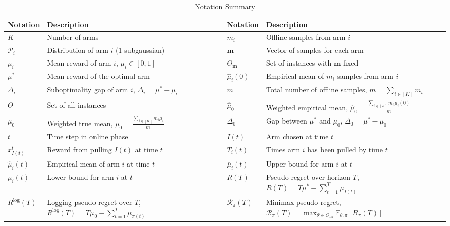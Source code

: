 \begin{APPENDICES}
\begin{table}[h]
\caption{Notation Summary}
    \centering
    \renewcommand{\arraystretch}{1.5}
    \begin{tabular}{|p{2.5cm}|p{5cm}|p{2.5cm}|p{5cm}|}
        \hline
        \textbf{Notation} & \textbf{Description} & \textbf{Notation} & \textbf{Description} \\ \hline
        $K$ & \small Number of arms & $m_i$ & \small Offline samples from arm $i$ \\ \hline
        $\mathcal{P}_i$ & \small Distribution of arm $i$ (1-subgaussian) & $\mathbf{m}$ & \small Vector of samples for each arm \\ \hline
        $\mu_i$ & \small Mean reward of arm $i$, $\mu_i \in [0,1]$ & $\Theta_{\mathbf{m}}$ & \small Set of instances with $\mathbf{m}$ fixed \\ \hline
        $\mu^*$ & \small Mean reward of the optimal arm & $\hat{\mu}_i(0)$ & \small Empirical mean of $m_i$ samples from arm $i$ \\ \hline
        $\Delta_i$ & \small Suboptimality gap of arm $i$, $\Delta_i = \mu^* - \mu_i$ & $m$ & \small Total number of offline samples, $m = \sum_{i \in [K]} m_i$ \\ \hline
        $\Theta$ & \small Set of all instances & $\hat{\mu}_0$ & \small Weighted empirical mean, $\hat{\mu}_0 = \frac{\sum_{i \in [K]} m_i \hat{\mu}_i(0)}{m}$ \\ \hline
        $\mu_0$ & \small Weighted true mean, $\mu_0 = \frac{\sum_{i \in [K]} m_i \mu_i}{m}$ & $\Delta_0$ & \small Gap between $\mu^*$ and $\mu_0$, $\Delta_0 = \mu^* - \mu_0$ \\ \hline
        $t$ & \small Time step in online phase &  $I(t)$& \small Arm chosen at time $t$ \\ \hline
        $x^t_{I(t)}$ & \small Reward from pulling $I(t)$ at time $t$ & $T_i(t)$ & \small Times arm $i$ has been pulled by time $t$ \\ \hline
        $ \hat{\mu}_i(t)$ & \small Empirical mean of arm $i$ at time $t$ &  $\overline{\mu}_i(t)$& \small Upper bound for arm $i$ at $t$ \\ \hline
        $\underline{\mu_i}(t)$ & \small Lower bound for arm $i$ at $t$ & $R(T)$ & \small Pseudo-regret over horizon $T$, $R(T) = T \mu^* - \sum_{t=1}^T \mu_{I(t)}$ \\ \hline
        $R^{\text{log}}(T)$ & \small Logging pseudo-regret over $T$, $R^{\text{log}}(T) = T \mu_0 - \sum_{t=1}^T \mu_{\pi(t)}$ & $\mathcal{R}_\pi(T)$ & \small Minimax pseudo-regret, $\mathcal{R}_\pi(T) = \max_{\theta \in \Theta_{\mathbf{m}}} \mathbb{E}_{\theta,\pi}[R_\pi(T)]$ \\ \hline

\end{tabular}
\end{table}
\end{APPENDICES}
